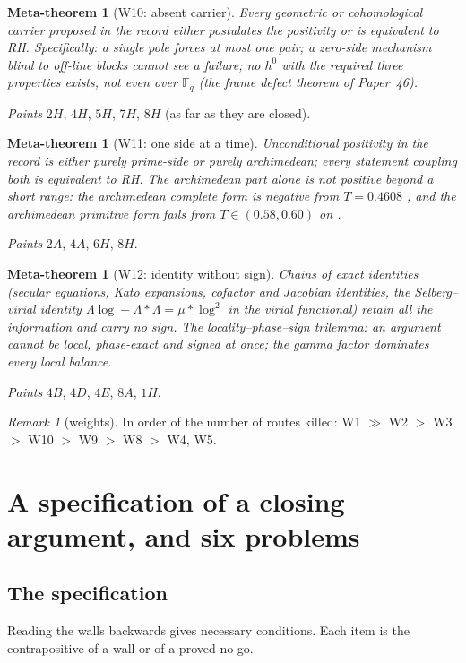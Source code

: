 \documentclass[11pt]{amsart}
\newtheorem{metatheorem}[theorem]{Meta-theorem}
\theoremstyle{definition}
\theoremstyle{remark}
\newtheorem{remark}[theorem]{Remark}
\begin{document}
\begin{metatheorem}[W10: absent carrier]\label{W10}
Every geometric or cohomological carrier proposed in the record either postulates the positivity or is
equivalent to RH. Specifically: a single pole forces at most one pair; a zero-side mechanism blind to
off-line blocks cannot see a failure; no $h^0$ with the required three properties exists, not even over
$\mathbb F_q$ (the frame defect theorem of Paper~46).
\end{metatheorem}
\noindent \emph{Paints} $2H$, $4H$, $5H$, $7H$, $8H$ (as far as they are closed).

\begin{metatheorem}[W11: one side at a time]\label{W11}
Unconditional positivity in the record is either purely prime-side or purely archimedean; every statement
coupling both is equivalent to RH. The archimedean part alone is not positive beyond a short range:
the archimedean complete form is negative from $T=0.4608$ \cite[Prop.~10.7]{Paper47}, and the archimedean
primitive form fails from $T\in(0.58,0.60)$ on \cite[Thm.~12.5(i)]{Paper47}.
\end{metatheorem}
\noindent \emph{Paints} $2A$, $4A$, $6H$, $8H$.

\begin{metatheorem}[W12: identity without sign]\label{W12}
Chains of exact identities (secular equations, Kato expansions, cofactor and Jacobian identities, the
Selberg--virial identity $\Lambda\log+\Lambda*\Lambda=\mu*\log^2$ in the virial functional) retain all the
information and carry no sign. The locality--phase--sign trilemma: an argument cannot be local, phase-exact
and signed at once; the gamma factor dominates every local balance.
\end{metatheorem}
\noindent \emph{Paints} $4B$, $4D$, $4E$, $8A$, $1H$.

\begin{remark}[weights]
In order of the number of routes killed: W1 $\gg$ W2 $>$ W3 $>$ W10 $>$ W9 $>$ W8 $>$ W4, W5.
\end{remark}

\section{A specification of a closing argument, and six problems}\label{sec:spec}

\subsection{The specification}
Reading the walls backwards gives necessary conditions. Each item is the contrapositive of a wall or of a
proved no-go.
\end{document}
